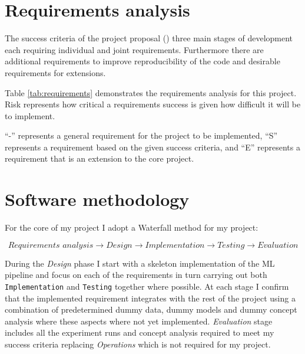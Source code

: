 \section{Requirements analysis}


The success criteria of the project proposal () three main stages of development each requiring individual and joint requirements.
Furthermore there are additional requirements to improve reproducibility of the code and desirable requirements for extensions.

Table \ref{tab:requirements} demonstrates the requirements analysis for this project.
Risk represents how critical a requirements success is given how difficult it will be to implement.

``-'' represents a general requirement for the project to be implemented, ``S'' represents a requirement based on the given success criteria, and ``E'' represents a requirement that is an extension to the core project.



\section{Software methodology}


For the core of my project I adopt a Waterfall method  for my project:

\begin{equation*}
    \textit{Requirements analysis} \longrightarrow \textit{Design} \longrightarrow \textit{Implementation} \longrightarrow \textit{Testing} \longrightarrow \textit{Evaluation}
\end{equation*}

During the \textit{Design} phase I start with a skeleton implementation of the ML pipeline and focus on each of the requirements in turn carrying out both \texttt{Implementation} and \texttt{Testing} together where possible.
At each stage I confirm that the implemented requirement integrates with the rest of the project using a combination of predetermined dummy data, dummy models and dummy concept analysis where these aspects where not yet implemented.
\textit{Evaluation} stage includes all the experiment runs and concept analysis required to meet my success criteria replacing \textit{Operations} which is not required for my project.

